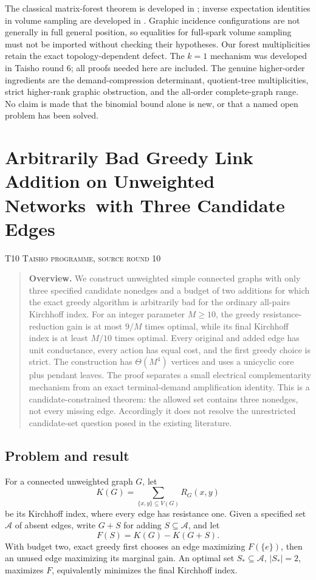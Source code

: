 \documentclass[11pt,a4paper]{article}
\theoremstyle{definition}\newtheorem{definition}[theorem]{Definition}
\theoremstyle{remark}\newtheorem{remark}[theorem]{Remark}
\numberwithin{equation}{section}
\begin{document}
The classical matrix-forest theorem is developed in \cite{ref053}; inverse expectation identities in volume sampling are developed in \cite{ref054}. Graphic incidence configurations are not generally in full general position, so equalities for full-spark volume sampling must not be imported without checking their hypotheses. Our forest multiplicities retain the exact topology-dependent defect. The $k=1$ mechanism was developed in Taisho round 6; all proofs needed here are included. The genuine higher-order ingredients are the demand-compression determinant, quotient-tree multiplicities, strict higher-rank graphic obstruction, and the all-order complete-graph range. No claim is made that the binomial bound alone is new, or that a named open problem has been solved.




\clearpage
\section[T10 --- Arbitrarily Bad Greedy Link Addition on Unweighted Networks\ with Three Candidate Edges]{Arbitrarily Bad Greedy Link Addition on Unweighted Networks\ with Three Candidate Edges}\label{contrib-T10}
\noindent\textsc{T10 \quad Taisho programme, source round 10}\par\medskip



\begin{quote}\small\textbf{Overview.} We construct unweighted simple connected graphs with only three specified candidate nonedges and a budget of two additions for which the exact greedy algorithm is arbitrarily bad for the ordinary all-pairs Kirchhoff index. For an integer parameter $M\ge10$, the greedy resistance-reduction gain is at most $9/M$ times optimal, while its final Kirchhoff index is at least $M/10$ times optimal. Every original and added edge has unit conductance, every action has equal cost, and the first greedy choice is strict. The construction has $\Theta(M^4)$ vertices and uses a unicyclic core plus pendant leaves. The proof separates a small electrical complementarity mechanism from an exact terminal-demand amplification identity. This is a candidate-constrained theorem: the allowed set contains three nonedges, not every missing edge. Accordingly it does not resolve the unrestricted candidate-set question posed in the existing literature.\end{quote}
\subsection{Problem and result}\label{T10-sec-1}
For a connected unweighted graph $G$, let
\[
 K(G)=\sum_{\{x,y\}\subseteq V(G)}R_G(x,y)
\]
be its Kirchhoff index, where every edge has resistance one. Given a specified set $\mathcal A$ of absent edges, write $G+S$ for adding $S\subseteq\mathcal A$, and let
\[
 F(S)=K(G)-K(G+S).
\]
With budget two, exact greedy first chooses an edge maximizing $F(\{e\})$, then an unused edge maximizing its marginal gain. An optimal set $S_*\subseteq\mathcal A$, $|S_*|=2$, maximizes $F$, equivalently minimizes the final Kirchhoff index.
\end{document}

